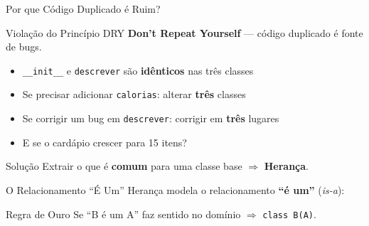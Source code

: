 \documentclass[aspectratio=169]{beamer}
\begin{document}
\begin{frame}{Por que Código Duplicado é Ruim?}
  \begin{alertblock}{Violação do Princípio DRY}
    \textbf{Don't Repeat Yourself} --- código duplicado é fonte de bugs.
  \end{alertblock}

  \bigskip

  \begin{itemize}
    \item \texttt{\_\_init\_\_} e \texttt{descrever} são \textbf{idênticos} nas três classes
    \item Se precisar adicionar \texttt{calorias}: alterar \textbf{três} classes
    \item Se corrigir um bug em \texttt{descrever}: corrigir em \textbf{três} lugares
    \item E se o cardápio crescer para 15 itens?
  \end{itemize}

  \bigskip

  \begin{exampleblock}{Solução}
    Extrair o que é \textbf{comum} para uma classe base $\Rightarrow$ \textbf{Herança}.
  \end{exampleblock}
\end{frame}

\begin{frame}{O Relacionamento ``É Um''}
  Herança modela o relacionamento \textbf{``é um''} (\emph{is-a}):

  \medskip


  \medskip

  \begin{alertblock}{Regra de Ouro}
    Se ``B é um A'' faz sentido no domínio $\Rightarrow$ \texttt{class B(A)}.
  \end{alertblock}
\end{frame}
\end{document}
